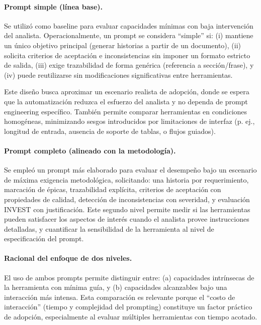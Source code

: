 \paragraph{Prompt simple (línea base).}
Se utilizó como baseline para evaluar capacidades mínimas con baja intervención del analista. Operacionalmente, un prompt se considera “simple” si:
(i) mantiene un único objetivo principal (generar historias a partir de un documento),
(ii) solicita criterios de aceptación e inconsistencias sin imponer un formato estricto de salida,
(iii) exige trazabilidad de forma genérica (referencia a sección/frase),
y (iv) puede reutilizarse sin modificaciones significativas entre herramientas.

Este diseño busca aproximar un escenario realista de adopción, donde se espera que la automatización reduzca el esfuerzo del analista y no dependa de prompt engineering específico. También permite comparar herramientas en condiciones homogéneas, minimizando sesgos introducidos por limitaciones de interfaz (p. ej., longitud de entrada, ausencia de soporte de tablas, o flujos guiados).

\paragraph{Prompt completo (alineado con la metodología).}
Se empleó un prompt más elaborado para evaluar el desempeño bajo un escenario de máxima exigencia metodológica, solicitando: una historia por requerimiento, marcación de épicas, trazabilidad explícita, criterios de aceptación con propiedades de calidad, detección de inconsistencias con severidad, y evaluación INVEST con justificación. Este segundo nivel permite medir si las herramientas pueden satisfacer los aspectos de interés cuando el analista provee instrucciones detalladas, y cuantificar la sensibilidad de la herramienta al nivel de especificación del prompt.

\paragraph{Racional del enfoque de dos niveles.}
El uso de ambos prompts permite distinguir entre: (a) capacidades intrínsecas de la herramienta con mínima guía, y (b) capacidades alcanzables bajo una interacción más intensa. Esta comparación es relevante porque el “costo de interacción” (tiempo y complejidad del prompting) constituye un factor práctico de adopción, especialmente al evaluar múltiples herramientas con tiempo acotado.

